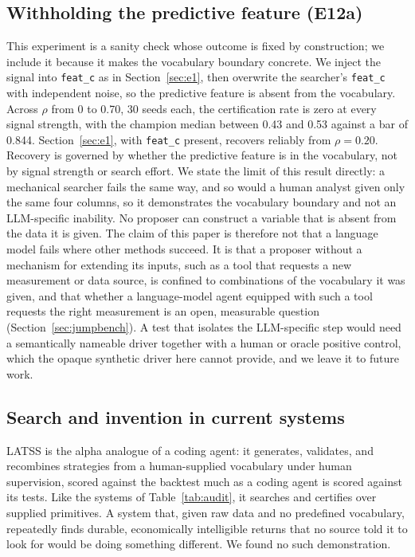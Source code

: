 \documentclass[11pt]{article}
\newcommand{\code}[1]{\texttt{#1}}
\begin{document}
\subsection{Withholding the predictive feature (E12a)}
\label{sec:e12a}

This experiment is a sanity check whose outcome is fixed by construction; we include it because it makes
the vocabulary boundary concrete. We inject the signal into \code{feat\_c} as in
Section~\ref{sec:e1}, then overwrite the searcher's \code{feat\_c} with independent noise, so the
predictive feature is absent from the vocabulary. Across $\rho$ from 0 to 0.70, 30 seeds each, the
certification rate is zero at every signal strength, with the champion median between 0.43 and 0.53 against a bar
of 0.844. Section~\ref{sec:e1}, with \code{feat\_c} present, recovers reliably from $\rho=0.20$.
Recovery is governed by whether the predictive feature is in the vocabulary, not by signal strength
or search effort. We state the limit of this result directly: a mechanical searcher fails the same
way, and so would a human analyst given only the same four columns, so it demonstrates the vocabulary
boundary and not an LLM-specific inability. No proposer can construct a variable that is absent from the
data it is given. The claim of this paper is therefore not that a language model fails where other
methods succeed. It is that a proposer without a mechanism for extending its inputs, such as a tool that
requests a new measurement or data source, is confined to combinations of the vocabulary it was given, and
that whether a language-model agent equipped with such a tool requests the right measurement is an open,
measurable question (Section~\ref{sec:jumpbench}). A test that
isolates the LLM-specific step would need a semantically nameable driver together with a human or
oracle positive control, which the opaque synthetic driver here cannot provide, and we leave it to
future work.

\subsection{Search and invention in current systems}

LATSS is the alpha analogue of a coding agent: it generates, validates, and recombines strategies from a
human-supplied vocabulary under human supervision, scored against the backtest much as a coding agent is
scored against its tests. Like the systems of Table~\ref{tab:audit}, it searches and certifies over
supplied primitives. A system that, given raw data and no predefined vocabulary, repeatedly finds durable,
economically intelligible returns that no source told it to look for would be doing something different.
We found no such demonstration.
\end{document}
